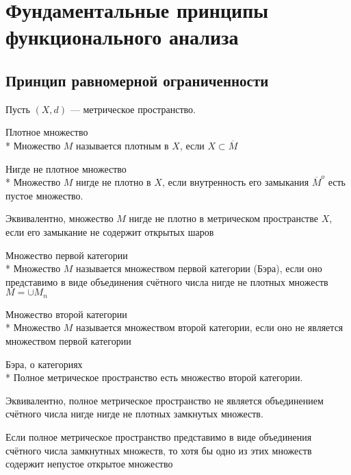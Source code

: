 \section{Фундаментальные принципы функционального анализа}

\subsection{Принцип равномерной ограниченности}

Пусть $(X, d)$ --- метрическое пространство.

\begin{dfn}{Плотное множество}\\*
  Множество $M$ называется плотным в $X$,
  если $X\subset \overline M$
\end{dfn}

\begin{dfn}{Нигде не плотное множество}\\*
  Множество $M$ нигде не плотно в $X$,
  если внутренность его замыкания
  ${\overline M}^o$ есть пустое множество.

  Эквивалентно,
  множество $M$ нигде не плотно
  в метрическом пространстве $X$,
  если его замыкание
  не содержит открытых шаров
\end{dfn}

\begin{dfn}{Множество первой категории}\\*
  Множество $M$ называется
  множеством первой категории (Бэра),
  если оно представимо в виде
  объединения счётного числа нигде не плотных множеств
  $M = \cup M_n$
\end{dfn}

\begin{dfn}{Множество второй категории}\\*
  Множество $M$ называется
  множеством второй категории,
  если оно не является
  множеством первой категории
\end{dfn}

\begin{thm}{Бэра, о категориях}\\*
  Полное метрическое пространство
  есть множество второй категории.

  Эквивалентно,
  полное метрическое пространство
  не является объединением счётного числа
  нигде нигде не плотных замкнутых множеств.
\end{thm}
\begin{corollary}
  Если полное метрическое пространство
  представимо в виде объединения
  счётного числа замкнутных множеств,
  то хотя бы одно из этих множеств
  содержит непустое открытое множество
\end{corollary}

